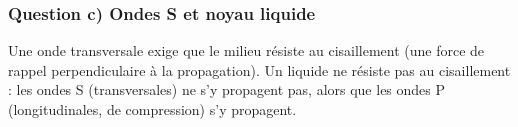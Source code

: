 \subsubsection*{Question c) Ondes S et noyau liquide}
Une onde transversale exige que le milieu résiste au cisaillement (une force de rappel perpendiculaire à la propagation). Un liquide ne résiste pas au cisaillement : les ondes S (transversales) ne s'y propagent pas, alors que les ondes P (longitudinales, de compression) s'y propagent.
